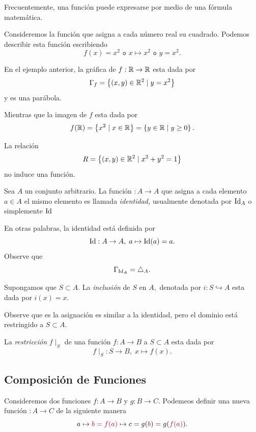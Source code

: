 Frecuentemente, una función puede expresarse por medio de una fórmula matemática. 
\begin{problema}
	Consideremos la función que asigna a cada número real su cuadrado. Podemos describir esta función escribiendo
	$$
	f(x)=x^{2} \texttt{ o } x\mapsto x^{2} \texttt{ o } y=x^{2}.
	$$
\end{problema}



En el ejemplo anterior, la gráfica de $f:\mathbb{R} \to \mathbb{R}$ esta dada por 
$$
\Gamma_{f}=\left\{ (x,y)\in \mathbb{R}^{2}\mid y=x^{2} \right\}
$$ y es una parábola.


Mientras que la imagen de $f$ esta dada por 
$$
f(\mathbb{R})=\left\{ x^{2}\mid x\in \mathbb{R} \right\}=\left\{ y\in \mathbb{R} \mid y\geq 0 \right\}.
$$



\begin{problema}
	La relación 
	$$
	R=\left\{ (x,y)\in \mathbb{R}^{2}\mid x^{2}+y^{2}=1 \right\}
	$$
	no induce una función.
\end{problema}




\begin{problema}
	Sea $A$ un conjunto arbitrario. La función $:A \to A$ que asigna a cada elemento $a\in A$ el mismo elemento es llamada \emph{identidad,} usualmente denotada por $\operatorname{Id}_{A}$ o simplemente $\operatorname{Id}$
	
	
	En otras palabras, la identidad está definida por $$
	\operatorname{Id}:A\to A, \; a \mapsto \operatorname{Id}(a)=a.
	$$ Observe que
	$$
	\Gamma_{\operatorname{Id}_{A}}=\triangle_{A}.
	$$
\end{problema}



 
 \begin{problema}
  Supongamos que $S \subset A.$ La \emph{inclusión} de $S$ en $A,$ denotada por $i: S \hookrightarrow A$ esta dada por $i(x)=x.$
 
 
 Observe que es la asignación es similar a la identidad, pero el dominio está restringido a $S \subset A.$
 
 
 La \emph{restricción} $f\mid_{S}$ de una función $f:A \to B$ a $S \subset A$ esta dada por
 $$
 f\mid_{S}: S \to B, \; x\mapsto f(x).
 $$
 \end{problema}
 
 

\subsection{Composición de Funciones}


Consideremos dos funciones $f:A \to B$ y $g:B \to C.$ Podemeos definir una nueva función $:A \to C$ de la siguiente manera
$$
a \mapsto {\color{purple}b=f(a)} \mapsto c=g({\color{purple}b})=g({\color{purple}f(a)}).
$$


